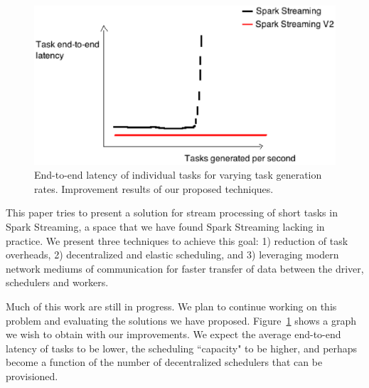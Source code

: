 \noindent

\begin{figure}[t!]
  \begin{center}
\includegraphics[scale=0.4]{money_graph.eps}
  \end{center}
  \caption{End-to-end latency of individual tasks for varying task generation rates. Improvement results of our proposed techniques.}
  \label{fig:money_graph}
\end{figure}

This paper tries to present a solution for stream processing of short tasks in Spark Streaming, a space that we have found Spark Streaming lacking in practice.
We present three techniques to achieve this goal: 1) reduction of task overheads, 2) decentralized and elastic scheduling, and 3) leveraging modern network mediums of communication for faster transfer of data between the driver, schedulers and workers.

Much of this work are still in progress. We plan to continue working on this problem and evaluating the solutions we have proposed. Figure~\ref{fig:money_graph} shows a graph we wish to obtain with our improvements. We expect the average end-to-end latency of tasks to be lower, the scheduling ``capacity" to be higher, and perhaps become a function of the number of decentralized schedulers that can be provisioned.
